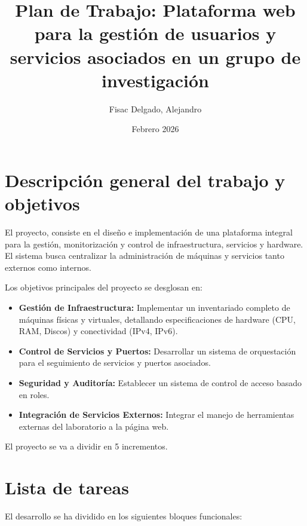 \documentclass[11pt,a4paper]{article}
\title{Plan de Trabajo: Plataforma web para la gestión de usuarios y servicios asociados en un grupo de investigación}
\author{Fisac Delgado, Alejandro}
\date{Febrero 2026}
\begin{document}
\maketitle

\section{Descripción general del trabajo y objetivos}
El proyecto, consiste en el diseño e implementación de una plataforma integral para la gestión, monitorización y control de infraestructura, servicios y hardware. El sistema busca centralizar la administración de máquinas y servicios tanto externos como internos.

Los objetivos principales del proyecto se desglosan en:
\begin{itemize}[label=$\bullet$]
    \item \textbf{Gestión de Infraestructura:} Implementar un inventariado completo de máquinas físicas y virtuales, detallando especificaciones de hardware (CPU, RAM, Discos) y conectividad (IPv4, IPv6).
    \item \textbf{Control de Servicios y Puertos:} Desarrollar un sistema de orquestación para el seguimiento de servicios y puertos asociados.
    \item \textbf{Seguridad y Auditoría:} Establecer un sistema de control de acceso basado en roles.
    \item \textbf{Integración de Servicios Externos:} Integrar el manejo de herramientas externas del laboratorio a la página web.
\end{itemize}

El proyecto se va a dividir en 5 incrementos.

\section{Lista de tareas}
El desarrollo se ha dividido en los siguientes bloques funcionales:
\end{document}
